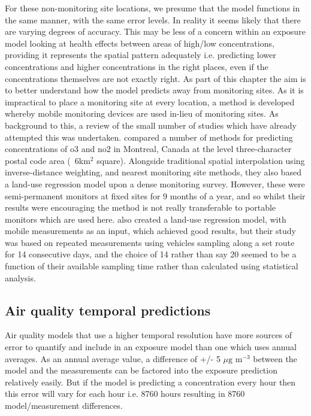 For these non-monitoring site locations, we presume that the model functions in the same manner, with the same error levels. In reality it seems likely that there are varying degrees of accuracy. This may be less of a concern within an exposure model looking at health effects between areas of high/low concentrations, providing it represents the spatial pattern adequately i.e. predicting lower concentrations and higher concentrations in the right places, even if the concentrations themselves are not exactly right. As part of this chapter the aim is to better understand how the model predicts away from monitoring sites. As it is impractical to place a monitoring site at every location, a method is developed whereby mobile monitoring devices are used in-lieu of monitoring sites. As background to this, a review of the small number of studies which have already attempted this was undertaken. \cite{Buteau2017} compared a number of methods for predicting concentrations of \gls{o3} and \gls{no2} in Montreal, Canada at the level three-character postal code area (~6km$^{2}$ square). Alongside traditional spatial interpolation using inverse-distance weighting, and nearest monitoring site methods, they also based a land-use regression model upon a dense monitoring survey. However, these were semi-permanent monitors at fixed sites for 9 months of a year, and so whilst their results were encouraging the method is not really transferable to portable monitors which are used here. \cite{Shi2016} also created a land-use regression model, with mobile measurements as an input, which achieved good results, but their study was based on repeated measurements using vehicles sampling along a set route for 14 consecutive days, and the choice of 14 rather than say 20 seemed to be a function of their available sampling time rather than calculated using statistical analysis.

\subsection{Air quality temporal predictions}
\label{air_quality_temporal_predictions}

Air quality models that use a higher temporal resolution have more sources of error to quantify and include in an exposure model than one which uses annual averages. As an annual average value, a difference of +/- 5 $\mu \text{g m}^{-3}$ between the model and the measurements can be factored into the exposure prediction relatively easily. But if the model is predicting a concentration every hour then this error will vary for each hour i.e. 8760 hours resulting in 8760 model/measurement differences.

